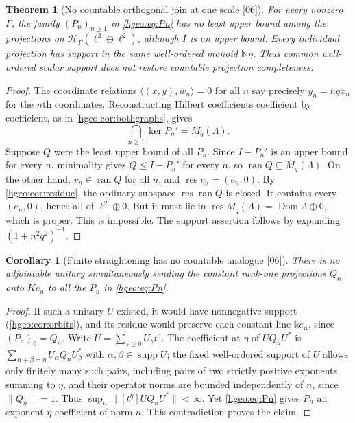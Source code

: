 \documentclass[11pt,letterpaper]{article}
\numberwithin{equation}{section}
\newtheorem{theorem}{Theorem}[section]
\newtheorem{corollary}[corollary]{Corollary}
\theoremstyle{definition}
\theoremstyle{remark}
\newcommand{\N}{\mathbb N}
\newcommand{\kk}{\mathbb k}
\newcommand{\K}{K}
\newcommand{\HH}[1]{\mathscr H_\Gamma(#1)}
\newcommand{\supp}{\operatorname{supp}}
\newcommand{\ran}{\operatorname{ran}}
\newcommand{\Dom}{\operatorname{Dom}}
\newcommand{\res}{\operatorname{res}}
\newcommand{\ip}[2]{\langle #1,#2\rangle}
\newcommand{\norm}[1]{\lVert #1\rVert}
\newcommand{\coeff}[2]{[t^{#1}]#2}
\newcommand{\src}[1]{\textup{\textsf{\small[#1]}}}
\begin{document}
\begin{theorem}[No countable orthogonal join at one scale \src{06}]
\label{hgeo:thm:nojoin}
For every nonzero $\Gamma$, the family $(P_n)_{n\ge1}$ in
\eqref{hgeo:eq:Pn} has no least upper bound among the projections on
$\HH{\ell^2\oplus\ell^2}$, although $I$ is an upper bound. Every
individual projection has support in the same well-ordered monoid
$\N\eta$. Thus common well-ordered scalar support does not restore
countable projection completeness.
\end{theorem}
\begin{proof}
The coordinate relations $\ip{(x,y)}{w_n}=0$ for all $n$ say precisely
$y_n=nqx_n$ for the $n$th coordinates. Reconstructing Hilbert coefficients
coefficient by coefficient, as in \cref{hgeo:cor:bothgraphs}, gives
\[
 \bigcap_{n\ge1}\ker P_n'=M_q(\Lambda).
\]
Suppose $Q$ were the least upper bound of all $P_n$. Since $I-P_n'$ is an
upper bound for every $n$, minimality gives $Q\le I-P_n'$ for every $n$,
so $\ran Q\subseteq M_q(\Lambda)$. On the other hand, $v_n\in\ran Q$
for all $n$, and $\res v_n=(e_n,0)$. By \cref{hgeo:cor:residue}, the ordinary
subspace $\res\ran Q$ is closed. It contains every $(e_n,0)$, hence all of
$\ell^2\oplus0$. But it must lie in $\res M_q(\Lambda)=\Dom\Lambda\oplus0$,
which is proper. This is impossible. The support assertion follows by
expanding $(1+n^2q^2)^{-1}$.
\end{proof}

\begin{corollary}[Finite straightening has no countable analogue \src{06}]
\label{hgeo:cor:nosimultaneous}
There is no adjointable unitary simultaneously sending the constant
rank-one projections $Q_n$ onto $\K e_n$ to all the $P_n$ in
\eqref{hgeo:eq:Pn}.
\end{corollary}
\begin{proof}
If such a unitary $U$ existed, it would have nonnegative support
(\cref{hgeo:cor:orbits}), and its residue would preserve each constant line
$\kk e_n$, since $(P_n)_0=Q_n$. Write $U=\sum_{\gamma\ge0}U_\gamma
t^\gamma$. The coefficient at $\eta$ of $UQ_nU^*$ is
$\sum_{\alpha+\beta=\eta}U_\alpha Q_nU_\beta^*$ with $\alpha,\beta\in\supp U$;
the fixed well-ordered support of $U$ allows only finitely many such pairs,
including pairs of two strictly positive exponents summing to $\eta$, and
their operator norms are bounded independently of $n$, since $\norm{Q_n}=1$.
Thus $\sup_n\norm{\coeff{\eta}{UQ_nU^*}}<\infty$. Yet \eqref{hgeo:eq:Pn}
gives $P_n$ an exponent-$\eta$ coefficient of norm $n$. This contradiction
proves the claim.
\end{proof}
\end{document}
